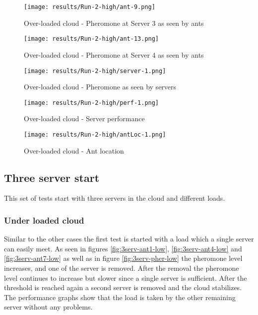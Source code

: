 \begin{figure}
	\centering
		\texttt{[image: results/Run-2-high/ant-9.png]}
	\caption{Over-loaded cloud - Pheromone at Server 3 as seen by ants}
	\label{fig:2serv-ant9-high}
\end{figure}

\begin{figure}
	\centering
		\texttt{[image: results/Run-2-high/ant-13.png]}
	\caption{Over-loaded cloud - Pheromone at Server 4 as seen by ants}
	\label{fig:2serv-ant13-high}
\end{figure}

\begin{figure}
	\centering
		\texttt{[image: results/Run-2-high/server-1.png]}
	\caption{Over-loaded cloud - Pheromone as seen by servers}
	\label{fig:2serv-pher-high}
\end{figure}

\begin{figure}
	\centering
		\texttt{[image: results/Run-2-high/perf-1.png]}
	\caption{Over-loaded cloud - Server performance}
	\label{fig:2serv-perf-high}
\end{figure}

\begin{figure}
	\centering
		\texttt{[image: results/Run-2-high/antLoc-1.png]}
	\caption{Over-loaded cloud - Ant location}
	\label{fig:2serv-antloc-high}
\end{figure}

\subsection{Three server start}

This set of tests start with three servers in the cloud and different loads.

\subsubsection{Under loaded cloud}

Similar to the other cases the first test is started with a load which a single server can easily meet. As seen in figures \ref{fig:3serv-ant1-low}, \ref{fig:3serv-ant4-low} and \ref{fig:3serv-ant7-low} as well as in figure \ref{fig:3serv-pher-low} the pheromone level increases, and one of the server is removed. After the removal the pheromone level continues to increase but slower since a single server is sufficient. After the threshold is reached again a second server is removed and the cloud stabilizes. The performance graphs show that the load is taken by the other remaining server without any problems.

